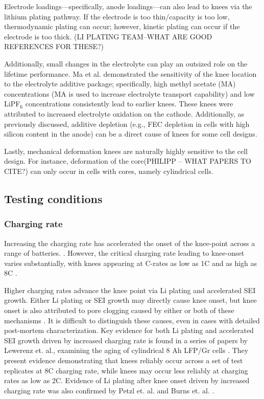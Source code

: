 \documentclass{article}
\begin{document}
Electrode loadings---specifically, anode loadings---can also lead to knees via the lithium plating pathway.
If the electrode is too thin/capacity is too low, thermodynamic plating can occur; however, kinetic plating can occur if the electrode is too thick. (LI PLATING TEAM--WHAT ARE GOOD REFERENCES FOR THESE?)

Additionally, small changes in the electrolyte can play an outsized role on the lifetime performance. Ma et al.\cite{ma_editors_2019} demonstrated the sensitivity of the knee location to the electrolyte additive package; specifically, high methyl acetate (MA) concentrations (MA is used to increase electrolyte transport capability) and low LiPF$_6$ concentrations consistently lead to earlier knees. These knees were attributed to increased electrolyte oxidation on the cathode. Additionally, as previously discussed, additive depletion (e.g., FEC depletion in cells with high silicon content in the anode) can be a direct cause of knees for some cell designs.

Lastly, mechanical deformation knees are naturally highly sensitive to the cell design. For instance, deformation of the core(PHILIPP -- WHAT PAPERS TO CITE?) can only occur in cells with cores, namely cylindrical cells.

\subsection{Testing conditions}

\subsubsection{Charging rate}
Increasing the charging rate has accelerated the onset of the knee-point across a range of batteries. \cite{lewerenz_systematic_2017,lewerenz_post-mortem_2017, petzl_lithium_2015, burns_-situ_2015, waldmann_optimization_2015, schuster_nonlinear_2015, severson_data-driven_2019, schindler_fast_2018, keil_linear_2019}. However, the critical charging rate leading to knee-onset varies substantially, with knees appearing at C-rates as low as 1C \cite{waldmann_optimization_2015} and as high as 8C \cite{lewerenz_systematic_2017}. 

Higher charging rates advance the knee point via Li plating and accelerated SEI growth. Either Li plating or SEI growth may directly cause knee onset, but knee onset is also attributed to pore clogging caused by either or both of these mechanisms \cite{yang_modeling_2017}. It is difficult to distinguish these causes, even in cases with detailed post-mortem characterization. Key evidence for both Li plating and accelerated SEI growth driven by increased charging rate is found in a series of papers by Lewerenz et. al., examining the aging of cylindrical 8 Ah LFP/Gr cells \cite{lewerenz_systematic_2017,lewerenz_post-mortem_2017}. They present evidence demonstrating that knees reliably occur across a set of test replicates at 8C charging rate, while knees may occur less reliably at charging rates as low as 2C. Evidence of Li plating after knee onset driven by increased charging rate was also confirmed by Petzl et. al. \cite{petzl_lithium_2015} and Burns et. al. \cite{burns_-situ_2015}. 
\end{document}
